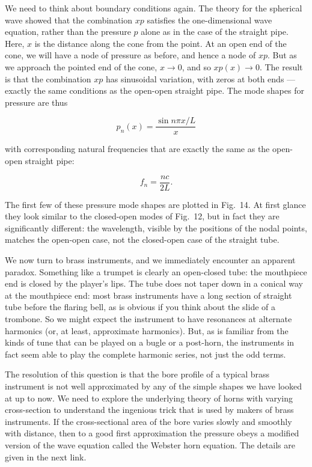   We need to think about boundary conditions again. The theory for the 
  spherical wave showed that the combination $xp$ satisfies the one-dimensional 
  wave equation, rather than the pressure $p$ alone as in the case of the 
  straight pipe. Here, $x$ is the distance along the cone from the point. At an 
  open end of the cone, we will have a node of pressure as before, and hence a 
  node of $xp$. But as we approach the pointed end of the cone, $x \rightarrow 
  0$, and so $xp(x) \rightarrow 0$. The result is that the combination $xp$ has 
  sinusoidal variation, with zeros at both ends --- exactly the same conditions 
  as the open-open straight pipe. The mode shapes for pressure are thus 

  $$p_n(x)=\dfrac{\sin n \pi x/L}{x} \tag{3}$$ 

  with corresponding natural frequencies that are exactly the same as the 
  open-open straight pipe: 

  $$f_n=\frac{nc}{2L} . \tag{4}$$ 

  The first few of these pressure mode shapes are plotted in Fig.\ 14. At first 
  glance they look similar to the closed-open modes of Fig.\ 12, but in fact 
  they are significantly different: the wavelength, visible by the positions of 
  the nodal points, matches the open-open case, not the closed-open case of the 
  straight tube. 

  We now turn to brass instruments, and we immediately encounter an apparent 
  paradox. Something like a trumpet is clearly an open-closed tube: the 
  mouthpiece end is closed by the player's lips. The tube does not taper down 
  in a conical way at the mouthpiece end: most brass instruments have a long 
  section of straight tube before the flaring bell, as is obvious if you think 
  about the slide of a trombone. So we might expect the instrument to have 
  resonances at alternate harmonics (or, at least, approximate harmonics). But, 
  as is familiar from the kinds of tune that can be played on a bugle or a 
  post-horn, the instruments in fact seem able to play the complete harmonic 
  series, not just the odd terms. 

  The resolution of this question is that the bore profile of a typical brass 
  instrument is not well approximated by any of the simple shapes we have 
  looked at up to now. We need to explore the underlying theory of horns with 
  varying cross-section to understand the ingenious trick that is used by 
  makers of brass instruments. If the cross-sectional area of the bore varies 
  slowly and smoothly with distance, then to a good first approximation the 
  pressure obeys a modified version of the wave equation called the Webster 
  horn equation. The details are given in the next link. 

